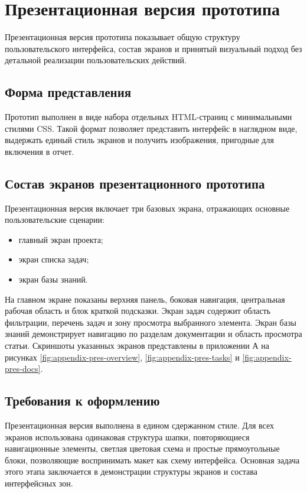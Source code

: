 \section{Презентационная версия прототипа}
\headingtextsep

Презентационная версия прототипа показывает общую структуру пользовательского интерфейса, состав экранов и принятый визуальный подход без детальной реализации пользовательских действий.

\textheadingsep
\subsection{Форма представления}
\headingtextsep

Прототип выполнен в виде набора отдельных HTML-страниц с минимальными стилями CSS. Такой формат позволяет представить интерфейс в наглядном виде, выдержать единый стиль экранов и получить изображения, пригодные для включения в отчет.

\textheadingsep
\subsection{Состав экранов презентационного прототипа}
\headingtextsep

Презентационная версия включает три базовых экрана, отражающих основные пользовательские сценарии:

\begin{itemize}
\item главный экран проекта;
\item экран списка задач;
\item экран базы знаний.
\end{itemize}

На главном экране показаны верхняя панель, боковая навигация, центральная рабочая область и блок краткой подсказки. Экран задач содержит область фильтрации, перечень задач и зону просмотра выбранного элемента. Экран базы знаний демонстрирует навигацию по разделам документации и область просмотра статьи. Скриншоты указанных экранов представлены в приложении А на рисунках \ref{fig:appendix-pres-overview}, \ref{fig:appendix-pres-tasks} и \ref{fig:appendix-pres-docs}.

\textheadingsep
\subsection{Требования к оформлению}
\headingtextsep

Презентационная версия выполнена в едином сдержанном стиле. Для всех экранов использована одинаковая структура шапки, повторяющиеся навигационные элементы, светлая цветовая схема и простые прямоугольные блоки, позволяющие воспринимать макет как схему интерфейса. Основная задача этого этапа заключается в демонстрации структуры экранов и состава интерфейсных зон.
